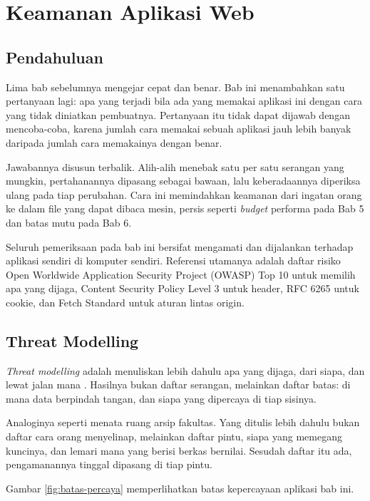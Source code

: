 \chapter{Keamanan Aplikasi Web}
\label{ch:keamanan}

\section{Pendahuluan}

Lima bab sebelumnya mengejar cepat dan benar. Bab ini menambahkan satu
pertanyaan lagi: apa yang terjadi bila ada yang memakai aplikasi ini dengan
cara yang tidak diniatkan pembuatnya. Pertanyaan itu tidak dapat dijawab
dengan mencoba-coba, karena jumlah cara memakai sebuah aplikasi jauh lebih
banyak daripada jumlah cara memakainya dengan benar.

Jawabannya disusun terbalik. Alih-alih menebak satu per satu serangan yang
mungkin, pertahanannya dipasang sebagai bawaan, lalu keberadaannya diperiksa
ulang pada tiap perubahan. Cara ini memindahkan keamanan dari ingatan orang
ke dalam file yang dapat dibaca mesin, persis seperti \textit{budget} performa
pada Bab 5 dan batas mutu pada Bab 6.

Seluruh pemeriksaan pada bab ini bersifat mengamati dan dijalankan terhadap
aplikasi sendiri di komputer sendiri. Referensi utamanya adalah daftar risiko
Open Worldwide Application Security Project (OWASP) Top 10
\cite{owasp-top10} untuk memilih apa yang dijaga, Content
Security Policy Level 3 \cite{w3c-csp3} untuk header, RFC 6265
\cite{rfc6265} untuk cookie, dan Fetch Standard \cite{whatwg-fetch} untuk
aturan lintas origin.

\section{Threat Modelling}

\textit{Threat modelling} adalah menuliskan lebih dahulu apa yang dijaga, dari
siapa, dan lewat jalan mana \cite{owasp-threat-modeling}. Hasilnya bukan
daftar serangan, melainkan daftar batas: di mana data berpindah tangan, dan
siapa yang dipercaya di tiap sisinya.

Analoginya seperti menata ruang arsip fakultas. Yang ditulis lebih dahulu
bukan daftar cara orang menyelinap, melainkan daftar pintu, siapa yang
memegang kuncinya, dan lemari mana yang berisi berkas bernilai. Sesudah
daftar itu ada, pengamanannya tinggal dipasang di tiap pintu.

Gambar \ref{fig:batas-percaya} memperlihatkan batas kepercayaan aplikasi bab
ini.


